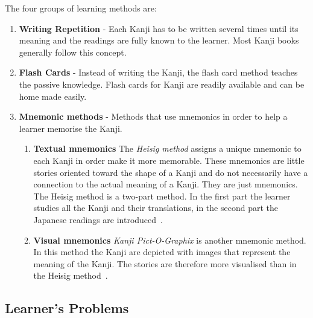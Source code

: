 The four groups of learning methods are:
\begin{enumerate}
  \item \textbf{Writing Repetition} - Each Kanji has to be written several times
        until its meaning and the readings are fully known to the learner.
        Most Kanji books generally follow this concept.

  \item \textbf{Flash Cards} - Instead of writing the Kanji, the flash card 
        method teaches the passive knowledge. Flash cards for Kanji are readily
        available and can be home made easily.

  \item \textbf{Mnemonic methods} - Methods that use mnemonics in order to help
        a learner memorise the Kanji.
        \begin{enumerate}
          \item \textbf{Textual mnemonics} The \emph{Heisig method} assigns a 
                unique mnemonic to each Kanji in order make it more memorable. 
                These mnemonics are little stories oriented toward the shape
                of a Kanji and do not necessarily have a connection to the 
                actual meaning of a Kanji. They are just mnemonics. 
                The Heisig method is a two-part method. In the first part
                the learner studies all the Kanji and their translations, 
                in the second part the Japanese readings are 
                introduced~.

          \item \textbf{Visual mnemonics} \emph{Kanji Pict-O-Graphix} is 
                another mnemonic method. In this method the Kanji are 
                depicted with images that represent the meaning of the Kanji.
                The stories are therefore more visualised than in the Heisig 
                method~.
          \end{enumerate}
\end{enumerate}


\subsection{Learner's Problems}
\label{sec:learnersproblems}

